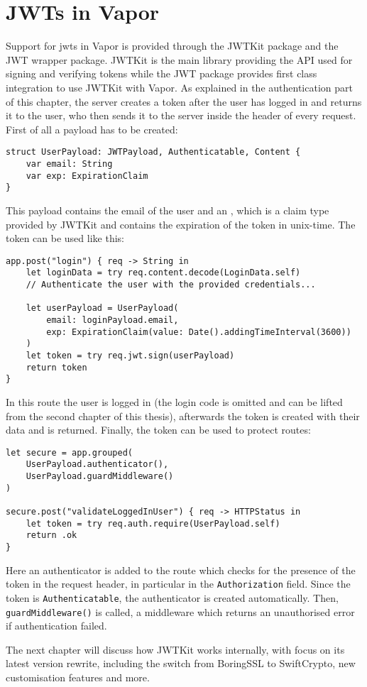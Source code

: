 \section{JWTs in Vapor}
Support for \gls{jwt}s in Vapor is provided through the JWTKit package and the JWT wrapper package. JWTKit is the main library providing the API used for signing and verifying tokens while the JWT package provides first class integration to use JWTKit with Vapor. As explained in the authentication part of this chapter, the server creates a token after the user has logged in and returns it to the user, who then sends it to the server inside the header of every request. First of all a payload has to be created:
\begin{verbatim}
struct UserPayload: JWTPayload, Authenticatable, Content {
    var email: String
    var exp: ExpirationClaim
}
\end{verbatim}
This payload contains the email of the user and an , which is a claim type provided by JWTKit and contains the expiration of the token in \gls{unix-time}.
The token can be used like this:
\begin{verbatim}
app.post("login") { req -> String in
    let loginData = try req.content.decode(LoginData.self)
    // Authenticate the user with the provided credentials...

    let userPayload = UserPayload(
        email: loginPayload.email, 
        exp: ExpirationClaim(value: Date().addingTimeInterval(3600))
    )
    let token = try req.jwt.sign(userPayload)
    return token
}
\end{verbatim}
In this route the user is logged in (the login code is omitted and can be lifted from the second chapter of this thesis), afterwards the token is created with their data and is returned. Finally, the token can be used to protect routes:
\begin{verbatim}
let secure = app.grouped(
    UserPayload.authenticator(), 
    UserPayload.guardMiddleware()
)

secure.post("validateLoggedInUser") { req -> HTTPStatus in
    let token = try req.auth.require(UserPayload.self)
    return .ok
}
\end{verbatim}
Here an authenticator is added to the  route which checks for the presence of the token in the request header, in particular in the \lstinline{Authorization} field. Since the token is \lstinline{Authenticatable}, the authenticator is created automatically. Then, \lstinline{guardMiddleware()} is called, a middleware which returns an unauthorised error if authentication failed.
\cite{vapor-docs}

The next chapter will discuss how JWTKit works internally, with focus on its latest version rewrite, including the switch from BoringSSL to SwiftCrypto, new customisation features and more.